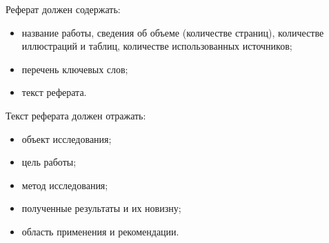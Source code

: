 \Referat

Реферат должен содержать:

\begin{itemize}
  \item название работы, сведения об объеме (количестве страниц), количестве иллюстраций и таблиц, количестве использованных источников;
  \item перечень ключевых слов;
  \item текст реферата.
\end{itemize}

Текст реферата должен отражать:

\begin{itemize}
  \item объект исследования;
  \item цель работы;
  \item метод исследования;
  \item полученные результаты и их новизну;
  \item область применения и рекомендации.
\end{itemize}
